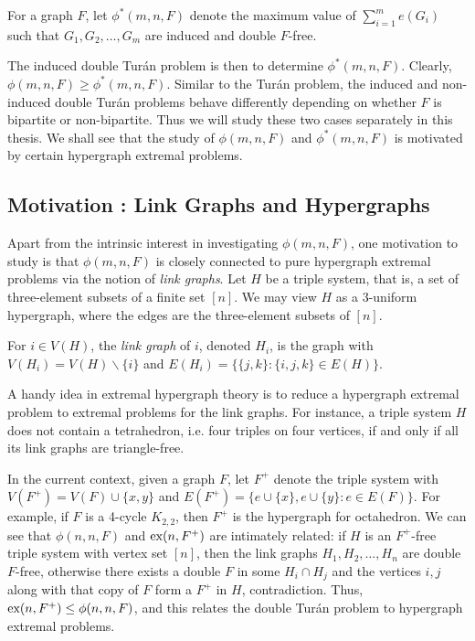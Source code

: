 \begin{definition}
  For a graph $F$, let $\phi^*(m, n, F)$ denote the maximum value of $\sum_{i = 1}^m e(G_i)$ such that $G_1, G_2, \dots, G_m$ are induced and double $F$-free.
\end{definition}

The induced double Tur\'{a}n problem is then to determine $\phi^*(m, n, F)$. Clearly, $\phi(m, n, F) \geq \phi^*(m, n, F)$. Similar to the Turán problem, the induced and non-induced double Turán problems behave differently depending on whether $F$ is bipartite or non-bipartite. Thus we will study these two cases separately in this thesis. We shall see that the study of $\phi(m, n, F)$ and $\phi^*(m, n, F)$ is motivated by certain hypergraph extremal problems.

\subsection{Motivation : Link Graphs and Hypergraphs}

Apart from the intrinsic interest in investigating $\phi(m, n, F)$, one motivation to study is that $\phi(m, n, F)$ is closely connected to pure hypergraph extremal problems via the notion of \textit{link graphs}. Let $H$ be a triple system, that is, a set of three-element subsets of a finite set $[n]$. We may view $H$ as a 3-uniform hypergraph, where the edges are the three-element subsets of $[n]$. 

\begin{definition}
  For $i \in V(H)$, the \textit{link graph} of $i$, denoted $H_i$, is the graph with $V(H_i) = V(H) \backslash \{i\}$ and $E(H_i) = \{\{j, k\} : \{i, j, k\} \in E(H)\}$.
\end{definition}

A handy idea in extremal hypergraph theory is to reduce a hypergraph extremal problem to extremal problems for the link graphs. For instance, a triple system $H$ does not contain a tetrahedron, i.e. four triples on four vertices, if and only if all its link graphs are triangle-free.

In the current context, given a graph $F$, let $F^+$ denote the triple system with $V(F^+) = V(F) \cup \{x, y\}$ and $E(F^+) = \{e \cup \{x\}, e \cup \{y\} : e \in E(F)\}$. For example, if $F$ is a 4-cycle $K_{2,2}$, then $F^+$ is the hypergraph for octahedron. We can see that $\phi(n, n, F)$ and $\textnormal{ex}(n, F^+)$ are intimately related: if $H$ is an $F^+$-free triple system with vertex set $[n]$, then the link graphs $H_1, H_2, \dots, H_n$ are double $F$-free, otherwise there exists a double $F$ in some $H_i \cap H_j$ and the vertices $i, j$ along with that copy of $F$ form a $F^+$ in $H$, contradiction. Thus, $\textnormal{ex}(n, F^+) \leq \phi(n, n, F)$, and this relates the double Tur\'{a}n problem to hypergraph extremal problems.

